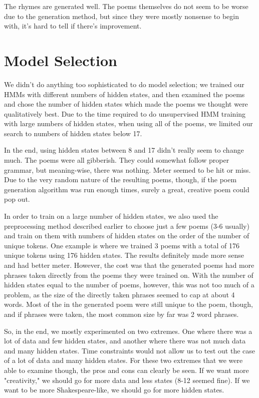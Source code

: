 \setlength{\leftskip}{0pt}

The rhymes are generated well. The poems themselves do not seem to be worse due to the generation method, but since they were mostly nonsense to begin with, it's hard to tell if there's improvement.

\section{Model Selection}
We didn't do anything too sophisticated to do model selection; we trained our HMMs with different numbers of hidden states, and then examined the poems and chose the number of hidden states which made the poems we thought were qualitatively best. Due to the time required to do unsupervised HMM training with large numbers of hidden states, when using all of the poems, we limited our search to numbers of hidden states below 17. 
\par In the end, using hidden states between 8 and 17 didn't really seem to change much. The poems were all gibberish. They could somewhat follow proper grammar, but meaning-wise, there was nothing. Meter seemed to be hit or miss. Due to the very random nature of the resulting poems, though, if the poem generation algorithm was run enough times, surely a great, creative poem could pop out.
\par In order to train on a large number of hidden states, we also used the preprocessing method described earlier to choose just a few poems (3-6 usually) and train on them with numbers of hidden states on the order of the number of unique tokens. One example is where we trained 3 poems with a total of 176 unique tokens using 176 hidden states. The results definitely made more sense and had better meter. However, the cost was that the generated poems had more phrases taken directly from the poems they were trained on. With the number of hidden states equal to the number of poems, however, this was not too much of a problem, as the size of the directly taken phrases seemed to cap at about 4 words. Most of the in the generated poem were still unique to the poem, though, and if phrases were taken, the most common size by far was 2 word phrases.
\par So, in the end, we mostly experimented on two extremes. One where there was a lot of data and few hidden states, and another where there was not much data and many hidden states. Time constraints would not allow us to test out the case of a lot of data and many hidden states. For these two extremes that we were able to examine though, the pros and cons can clearly be seen. If we want more "creativity," we should go for more data and less states (8-12 seemed fine). If we want to be more Shakespeare-like, we should go for more hidden states. 


